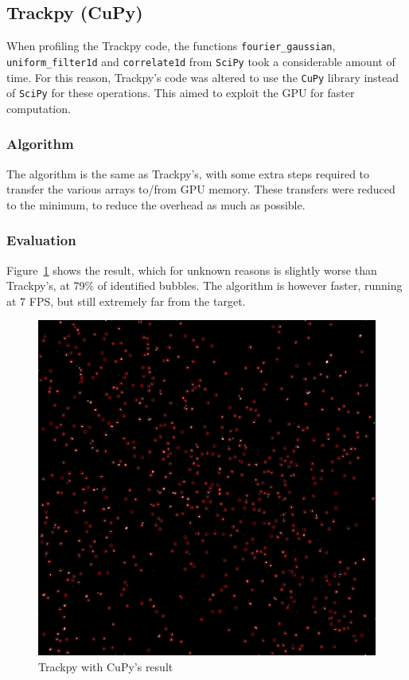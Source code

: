 \subsection{Trackpy (CuPy)}

When profiling the Trackpy code, the functions \texttt{fourier\_gaussian}, \texttt{uniform\_filter1d} and \texttt{correlate1d} from \texttt{SciPy} took a considerable amount of time.
For this reason, Trackpy's code was altered to use the \texttt{CuPy} library instead of \texttt{SciPy} for these operations.
This aimed to exploit the GPU for faster computation.

\subsubsection{Algorithm}

The algorithm is the same as Trackpy's, with some extra steps required to transfer the various arrays to/from GPU memory.
These transfers were reduced to the minimum, to reduce the overhead as much as possible.

\subsubsection{Evaluation}

Figure~\ref{fig:locate:trackpy-cupy} shows the result, which for unknown reasons is slightly worse than Trackpy's, at 79\% of identified bubbles.
The algorithm is however faster, running at 7 FPS, but still extremely far from the target.

\begin{figure}
	\centerline{\includegraphics[width=\locateimgsize]{images/locate/cuda-trackpy.png}}
	\caption{\centering Trackpy with CuPy's result}
	\label{fig:locate:trackpy-cupy}
\end{figure}
